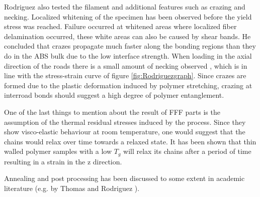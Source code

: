 Rodriguez \cite{Rodriguez2001MechanicalInvestigation} also tested the filament and additional features such as crazing and necking. Localized whitening of the specimen has been observed before the yield stress was reached. Failure occurred at whitened areas where localized fiber delamination occurred, these white areas can also be caused by shear bands. He concluded that crazes propagate much faster along the bonding regions than they do in the ABS bulk due to the low interface strength. When loading in the axial direction of the roads there is a small amount of necking observed \cite{Garg2017AnStudy}, which is in line with the stress-strain curve of figure \ref{fig:Rodriguezgraph}. Since crazes are formed due to the plastic deformation induced by polymer stretching, crazing at interroad bonds should suggest a high degree of polymer entanglement.

One of the last things to mention about the result of FFF parts is the assumption of the thermal residual stresses induced by the process. Since they show visco-elastic behaviour at room temperature, one would suggest that the chains would relax over time towards a relaxed state. It has been shown \cite{Veen2019EnhancingTemperature} that thin walled polymer samples with a low $T_g$ will relax its chains after a period of time resulting in a strain in the z direction. %

Annealing and post processing has been discussed to some extent in academic literature (e.g. by Thomas and Rodriguez \cite{Thomas2000ModelingRoads}).







